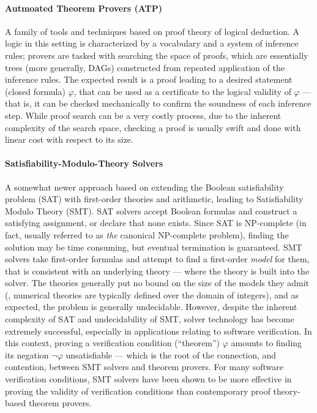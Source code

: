 \paragraph{Autmoated Theorem Provers (ATP)} A family of tools and techniques based on proof
theory of logical deduction.
A logic in this setting is characterized by a vocabulary and a system of
inference rules; provers are tasked with searching the space of proofs, which
are essentially trees (more generally, DAGs) constructed from repeated
application of the inference rules.
The expected result is a proof leading to a desired statement (closed formula)
$\varphi$, that can be used as a certificate to the logical validity of
$\varphi$ --- that is, it can be checked mechanically to confirm the soundness
of each inference step.
While proof search can be a very costly process, due to the inherent complexity
of the search space, checking a proof is usually swift and done with linear
cost with respect to its size.

\paragraph{Satisfiability-Modulo-Theory Solvers} A somewhat newer approach based on extending the
Boolean satisfiability problem (SAT) with first-order theories and arithmetic, leading to
Satisfiability Modulo Theory (SMT).
SAT solvers accept Boolean formulas and construct a satisfying assignment, or
declare that none exists.
Since SAT is NP-complete (in fact, usually referred to as \emph{the} canonical
NP-complete problem), finding the solution may be time consuming, but eventual
termination is guaranteed.
SMT solvers take first-order formulas and attempt to find a first-order
\emph{model} for them, that is consistent with an underlying theory --- where the
theory is built into the solver.
The theories generally put no bound on the size of the models they admit
(\eg, numerical theories are typically defined over the domain of integers),
and as expected, the problem is generally undecidable.
However, despite the inherent complexity of SAT and undecidability of SMT,
solver technology has become extremely successful, especially in applications
relating to software verification.
In this context, proving a verification condition (``theorem'') $\varphi$
amounts to finding its negation $\lnot\varphi$ unsatisfiable --- which is the root
of the connection, and contention, between SMT solvers and theorem provers.
For many software verification conditions, SMT solvers have been shown to be
more effective in proving the validity of verification conditions than
contemporary proof theory-based theorem provers.

